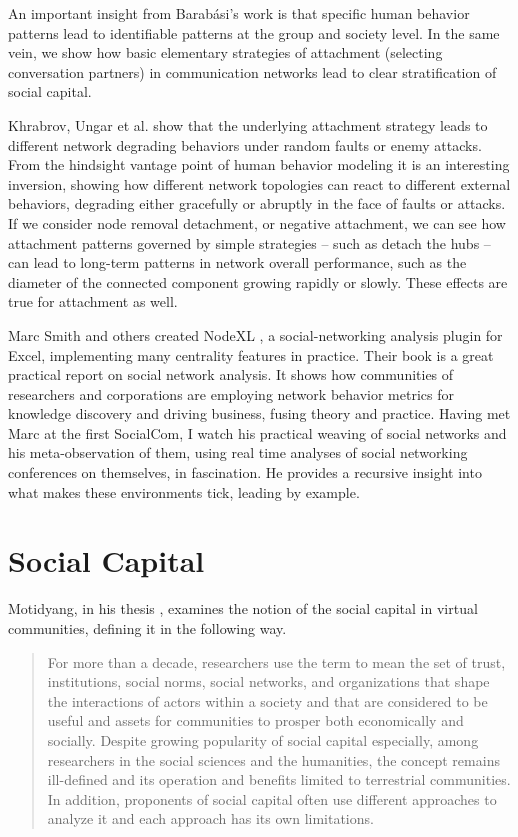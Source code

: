 \documentclass[10pt,oneside]{memoir}
\begin{document}
\begin{Spacing}{2}
An important insight from Barabási's work is that specific human behavior patterns lead to identifiable patterns at the group and society level.  In the same vein, we show how basic elementary strategies of attachment (selecting conversation partners) in communication networks lead to clear stratification of social capital.


Khrabrov, Ungar et al. \cite{Khrabrov:2003:Attacks} show that the underlying attachment strategy leads to different network degrading behaviors under random faults or enemy attacks.  From the hindsight vantage point of human behavior modeling it is an interesting inversion, showing how different network topologies can react to different external behaviors, degrading either gracefully or abruptly in the face of faults or attacks.  If we consider node removal detachment, or negative attachment, we can see how attachment patterns governed by simple strategies -- such as detach the hubs -- can lead to long-term patterns in network overall performance, such as the diameter of the connected component growing rapidly or slowly.  These effects are true for attachment as well.


Marc Smith and others created NodeXL \cite{smith2011nodexl}, a social-networking analysis plugin for Excel, implementing many centrality features in practice.  Their book is a great practical report on social network analysis.  It shows how communities of researchers and corporations are employing network behavior metrics for knowledge discovery and driving business, fusing theory and practice.  Having met Marc at the first SocialCom, I watch his practical weaving of social networks and his meta-observation of them, using real time analyses of social networking conferences on themselves, in fascination.  He provides a recursive insight into what makes these environments tick, leading by example. 


\pagebreak \section{Social Capital}
\label{socialcapital}

Motidyang, in his thesis \cite{Motidyang:2007:Thesis}, examines the notion of the social capital in virtual communities, defining it in the following way.


\begin{quote}
For more than a decade, researchers use the term to mean the set of trust, institutions, social norms, social networks, and organizations that shape the interactions of actors within a society and that are considered to be useful and assets for communities to prosper both economically and socially. Despite growing popularity of social capital especially, among researchers in the social sciences and the humanities, the concept remains ill-defined and its operation and benefits limited to terrestrial communities. In addition, proponents of social capital often use different approaches to analyze it and each approach has its own limitations.
\end{quote}



\end{Spacing}
\end{document}
